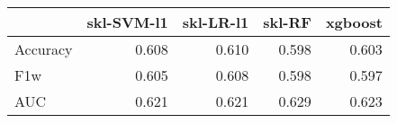 \begin{tabular}{lrrrr}
\toprule
{} &  skl-SVM-l1 &  skl-LR-l1 &  skl-RF &  xgboost \\
\midrule
Accuracy &       0.608 &      0.610 &   0.598 &    0.603 \\
F1w      &       0.605 &      0.608 &   0.598 &    0.597 \\
AUC      &       0.621 &      0.621 &   0.629 &    0.623 \\
\bottomrule
\end{tabular}
